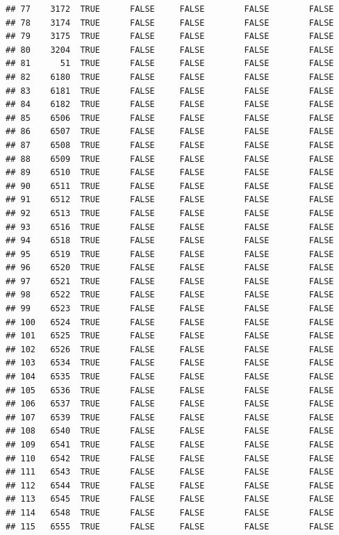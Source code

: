 \documentclass[
  10pt,
  b5paper,
  oneside]{book}
\begin{document}
\begin{verbatim}
## 77    3172  TRUE      FALSE     FALSE        FALSE        FALSE
## 78    3174  TRUE      FALSE     FALSE        FALSE        FALSE
## 79    3175  TRUE      FALSE     FALSE        FALSE        FALSE
## 80    3204  TRUE      FALSE     FALSE        FALSE        FALSE
## 81      51  TRUE      FALSE     FALSE        FALSE        FALSE
## 82    6180  TRUE      FALSE     FALSE        FALSE        FALSE
## 83    6181  TRUE      FALSE     FALSE        FALSE        FALSE
## 84    6182  TRUE      FALSE     FALSE        FALSE        FALSE
## 85    6506  TRUE      FALSE     FALSE        FALSE        FALSE
## 86    6507  TRUE      FALSE     FALSE        FALSE        FALSE
## 87    6508  TRUE      FALSE     FALSE        FALSE        FALSE
## 88    6509  TRUE      FALSE     FALSE        FALSE        FALSE
## 89    6510  TRUE      FALSE     FALSE        FALSE        FALSE
## 90    6511  TRUE      FALSE     FALSE        FALSE        FALSE
## 91    6512  TRUE      FALSE     FALSE        FALSE        FALSE
## 92    6513  TRUE      FALSE     FALSE        FALSE        FALSE
## 93    6516  TRUE      FALSE     FALSE        FALSE        FALSE
## 94    6518  TRUE      FALSE     FALSE        FALSE        FALSE
## 95    6519  TRUE      FALSE     FALSE        FALSE        FALSE
## 96    6520  TRUE      FALSE     FALSE        FALSE        FALSE
## 97    6521  TRUE      FALSE     FALSE        FALSE        FALSE
## 98    6522  TRUE      FALSE     FALSE        FALSE        FALSE
## 99    6523  TRUE      FALSE     FALSE        FALSE        FALSE
## 100   6524  TRUE      FALSE     FALSE        FALSE        FALSE
## 101   6525  TRUE      FALSE     FALSE        FALSE        FALSE
## 102   6526  TRUE      FALSE     FALSE        FALSE        FALSE
## 103   6534  TRUE      FALSE     FALSE        FALSE        FALSE
## 104   6535  TRUE      FALSE     FALSE        FALSE        FALSE
## 105   6536  TRUE      FALSE     FALSE        FALSE        FALSE
## 106   6537  TRUE      FALSE     FALSE        FALSE        FALSE
## 107   6539  TRUE      FALSE     FALSE        FALSE        FALSE
## 108   6540  TRUE      FALSE     FALSE        FALSE        FALSE
## 109   6541  TRUE      FALSE     FALSE        FALSE        FALSE
## 110   6542  TRUE      FALSE     FALSE        FALSE        FALSE
## 111   6543  TRUE      FALSE     FALSE        FALSE        FALSE
## 112   6544  TRUE      FALSE     FALSE        FALSE        FALSE
## 113   6545  TRUE      FALSE     FALSE        FALSE        FALSE
## 114   6548  TRUE      FALSE     FALSE        FALSE        FALSE
## 115   6555  TRUE      FALSE     FALSE        FALSE        FALSE

\end{verbatim}
\end{document}
